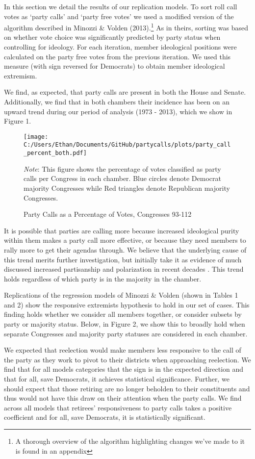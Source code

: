 \documentclass[12pt]{article}
\newcommand\fnote[1]{\captionsetup{font=small}\caption*{#1}}
\begin{document}
In this section we detail the results of our replication models. To sort roll call votes as `party calls' and `party free votes' we used a modified version of the algorithm described in Minozzi \& Volden (2013).\footnote{A thorough overview of the algorithm highlighting changes we've made to it is found in an appendix} As in theirs, sorting was based on whether vote choice was significantly predicted by party status when controlling for ideology. For each iteration, member ideological positions were calculated on the party free votes from the previous iteration. We used this measure (with sign reversed for Democrats) to obtain member ideological extremism. 

We find, as expected, that party calls are present in both the House and Senate. Additionally, we find that in both chambers their incidence has been on an upward trend during our period of analysis (1973 - 2013), which we show in Figure 1. 


\begin{figure}[H]
	\centering
	\caption{Party Calls as a Percentage of Votes, Congresses 93-112}
	\texttt{[image: C:/Users/Ethan/Documents/GitHub/partycalls/plots/party\_call\_percent\_both.pdf]}
	\fnote{\textit{Note}: This figure shows the percentage of votes classified as party calls per Congress in each chamber. Blue circles denote Democrat majority Congresses while Red triangles denote Republican majority Congresses.}
\end{figure}

\noindent
It is possible that parties are calling more because increased ideological purity within them makes a party call more effective, or because they need members to rally more to get their agendas through. We believe that the underlying cause of this trend merits further investigation, but initially take it as evidence of much discussed increased partisanship and polarization in recent decades \cite{Lee:2009, Lee:2016, Theriault:2013, Smith:2014}. This trend holds regardless of which party is in the majority in the chamber.

Replications of the regression models of Minozzi \& Volden (shown in Tables 1 and 2) show the responsive extremists hypothesis to hold in our set of cases. This finding holds whether we consider all members together, or consider subsets by party or majority status. Below, in Figure 2, we show this to broadly hold when separate Congresses and majority party statuses are considered in each chamber.

We expected that reelection would make members less responsive to the call of the party as they work to pivot to their districts when approaching reelection. We find that for all models categories that the sign is in the expected direction and that for all, save Democrats, it achieves statistical significance. Further, we should expect that those retiring are no longer beholden to their constituents and thus would not have this draw on their attention when the party calls. We find across all models that retirees' responsiveness to party calls takes a positive coefficient and for all, save Democrats, it is statistically significant. 
\end{document}
